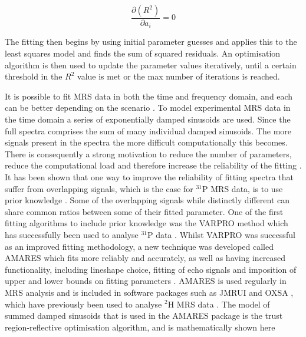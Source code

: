 \begin{equation}
    \frac{\partial (R^2)}{\partial a_i} = 0
    \label{eqn:theory:Diff}
\end{equation}

\noindent The fitting then begins by using initial parameter guesses and applies this to the least squares model and finds the sum of squared residuals. An optimisation algorithm is then used to update the parameter values iteratively, until a certain threshold in the $R^2$ value is met or the max number of iterations is reached. 

It is possible to fit MRS data in both the time and frequency domain, and each can be better depending on the scenario \cite{Poullet2008MRSMethods}. To model experimental \ac{MRS} data in the time domain a series of exponentially damped sinusoids are used. Since the full spectra comprises the sum of many individual damped sinusoids. The more signals present in the spectra the more difficult computationally this becomes. There is consequently a strong motivation to reduce the number of parameters, reduce the computational load and therefore increase the reliability of the fitting \cite{Near2021PreprocessingRecommendations}. It has been shown that one way to improve the reliability of fitting spectra that suffer from overlapping signals, which is the case for $^{31}$P \ac{MRS} data, is to use prior knowledge \cite{Hamilton2003PriorSpectra}. Some of the overlapping signals while distinctly different can share common ratios between some of their fitted parameter. One of the first fitting algorithms to include prior knowledge was the \ac{VARPRO} method \cite{Golub1973TheSeparate} which has successfully been used to analyse $^{31}$P data \cite{vanderVeen1988AccurateKnowledge,Stubbs199631P-MagneticADP}. Whilst \ac{VARPRO} was successful as an improved fitting methodology, a new technique was developed called \ac{AMARES} which fits more reliably and accurately, as well as having increased functionality, including lineshape choice, fitting of echo signals and imposition of upper and lower bounds on fitting parameters \cite{Vanhamme1997ImprovedKnowledge}. \ac{AMARES} is used regularly in \ac{MRS} analysis and is included in software packages such as JMRUI \cite{Stefan2009QuantitationPackage} and OXSA \cite{Purvis2017OXSA:MATLAB}, which have previously been used to analyse $^2$H \ac{MRS} data \cite{Simoes2022GlucoseGlioblastoma,Kreis2020MeasuringMRI,Kaggie2022DeuteriumMetabolism}. The model of summed damped sinusoids that is used in the \ac{AMARES} package is the trust region-reflective optimisation algorithm, and is mathematically shown here

